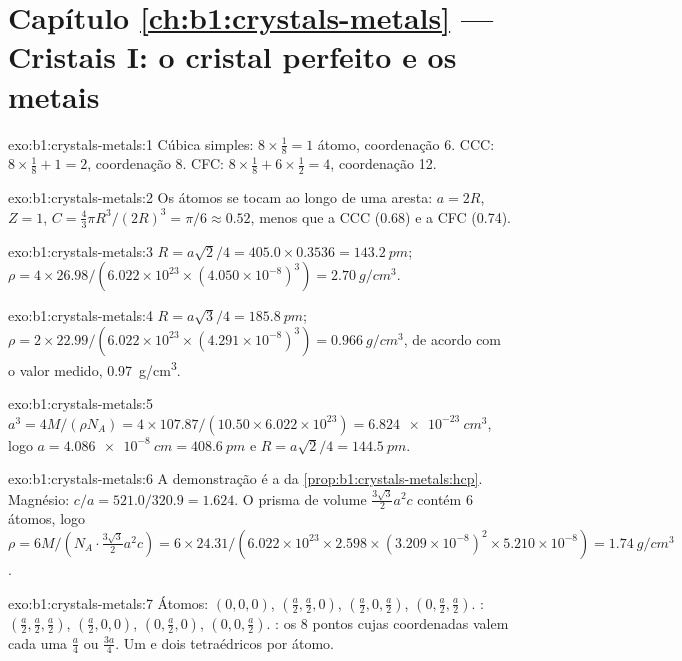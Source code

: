 \section*{Capítulo \ref{ch:b1:crystals-metals} --- Cristais I: o cristal perfeito e os metais}

\begin{solution}{exo:b1:crystals-metals:1}
Cúbica simples: $8 \times \frac18 = 1$ átomo, coordenação 6. CCC: $8 \times
\frac18 + 1 = 2$, coordenação 8. CFC: $8 \times \frac18 + 6 \times
\frac12 = 4$, coordenação 12.
\end{solution}

\begin{solution}{exo:b1:crystals-metals:2}
Os átomos se tocam ao longo de uma aresta: $a = 2R$, $Z = 1$, $C = \frac43\pi R^3/(2R)^3
= \pi/6 \approx 0.52$, menos que a CCC (0.68) e a CFC (0.74).
\end{solution}

\begin{solution}{exo:b1:crystals-metals:3}
$R = a\sqrt2/4 = 405.0 \times 0.3536 = \qty{143.2}{pm}$;
$\rho = 4 \times 26.98/(6.022 \times 10^{23} \times (4.050 \times
10^{-8})^3) = \qty{2.70}{g/cm^3}$.
\end{solution}

\begin{solution}{exo:b1:crystals-metals:4}
$R = a\sqrt3/4 = \qty{185.8}{pm}$; $\rho = 2 \times 22.99/(6.022 \times
10^{23} \times (4.291 \times 10^{-8})^3) = \qty{0.966}{g/cm^3}$, de
acordo com o valor medido, \qty{0.97}{g/cm^3}.
\end{solution}

\begin{solution}{exo:b1:crystals-metals:5}
$a^3 = 4M/(\rho N_A) = 4 \times 107.87/(10.50 \times 6.022 \times 10^{23}) =
\qty{6.824e-23}{cm^3}$, logo $a = \qty{4.086e-8}{cm} = \qty{408.6}{pm}$ e
$R = a\sqrt2/4 = \qty{144.5}{pm}$.
\end{solution}

\begin{solution}{exo:b1:crystals-metals:6}
A demonstração é a da \cref{prop:b1:crystals-metals:hcp}. Magnésio:
$c/a = 521.0/320.9 = 1.624$. O prisma de volume
$\frac{3\sqrt3}{2}a^2c$ contém 6 átomos, logo $\rho = 6M/(N_A \cdot
\frac{3\sqrt3}{2}a^2c) = 6 \times 24.31/(6.022 \times 10^{23} \times
2.598 \times (3.209 \times 10^{-8})^2 \times 5.210 \times 10^{-8}) =
\qty{1.74}{g/cm^3}$.
\end{solution}

\begin{solution}{exo:b1:crystals-metals:7}
Átomos: $(0,0,0)$, $(\frac a2,\frac a2,0)$, $(\frac a2,0,\frac a2)$,
$(0,\frac a2,\frac a2)$. : $(\frac a2,\frac a2,\frac a2)$,
$(\frac a2,0,0)$, $(0,\frac a2,0)$, $(0,0,\frac a2)$. :
os 8 pontos cujas coordenadas valem cada uma $\frac a4$ ou $\frac{3a}{4}$.
Um  e dois tetraédricos por átomo.
\end{solution}

